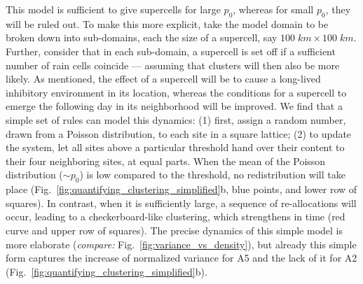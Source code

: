 \documentclass{article}
\begin{document}
This model is sufficient to give supercells for large $p_0$, whereas for small $p_0$, they will be ruled out.
To make this more explicit, take the model domain to be broken down into sub-domains, each the size of a supercell, say $100\;km\times 100\;km$.
Further, consider that in each sub-domain, a supercell is set off if a sufficient number of rain cells coincide --- assuming that clusters will then also be more likely.
As mentioned, the effect of a supercell will be to cause a long-lived inhibitory environment in its location, whereas the conditions for a supercell to emerge the following day in its neighborhood will be improved. 
We find that a simple set of rules can model this dynamics: 
(1) first, assign a random number, drawn from a Poisson distribution, to each site in a square lattice; 
(2) to update the system, let all sites above a particular threshold hand over their content to their four neighboring sites, at equal parts. 
When the mean of the Poisson distribution ($\sim p_0$) is low compared to the threshold, no redistribution will take place (Fig.~\ref{fig:quantifying_clustering_simplified}b, blue points, and lower row of squares). 
In contrast, when it is sufficiently large, a sequence of re-allocations will occur, leading to a checkerboard-like clustering, which strengthens in time (red curve and upper row of squares).
The precise dynamics of this simple model is more elaborate ({\it compare:} Fig.~\ref{fig:variance_vs_density}), but already this simple form captures the increase of normalized variance for A5 and the lack of it for A2 (Fig.~\ref{fig:quantifying_clustering_simplified}b).
\end{document}
